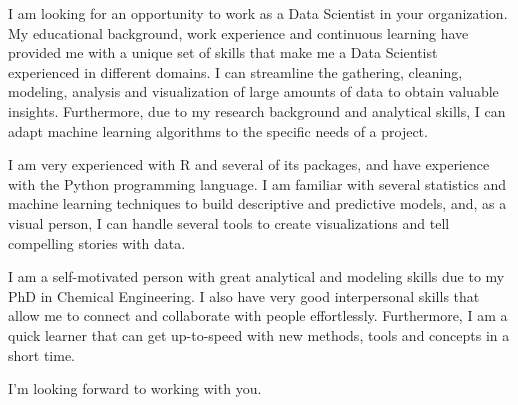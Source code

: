 \documentclass[11pt, a4paper]{awesome-cv}
\begin{document}
\makecvheader[R]


\makelettertitle

\begin{cvletter}


I am looking for an opportunity to work as a Data Scientist in your organization. My educational background, work experience and continuous learning have provided me with a unique set of skills that make me a Data Scientist experienced in different domains. I can streamline the gathering, cleaning, modeling, analysis and visualization of large amounts of data to obtain valuable insights. Furthermore, due to my research background and analytical skills, I can adapt machine learning algorithms to the specific needs of a project.

I am very experienced with R and several of its packages, and have experience with the Python programming language. I am familiar with several statistics and machine learning techniques to build descriptive and predictive models, and, as a visual person, I can handle several tools to create visualizations and tell compelling stories with data.

I am a self-motivated person with great analytical and modeling skills due to my PhD in Chemical Engineering. I also have very good interpersonal skills that allow me to connect and collaborate with people effortlessly. Furthermore, I am a quick learner that can get up-to-speed with new methods, tools and concepts in a short time.

I'm looking forward to working with you.


\end{cvletter}


\makeletterclosing
\end{document}

